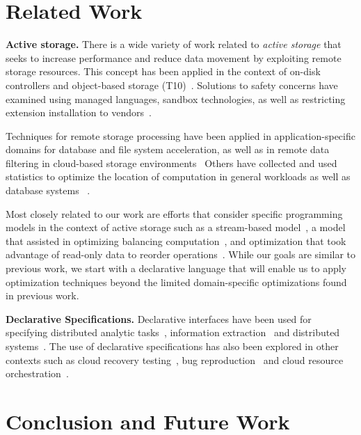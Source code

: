 \documentclass[10pt,twocolumn]{article}
\begin{document}
\section{Related Work}

{\bf Active storage.}
There is a wide variety of work related to \emph{active storage} that seeks to
increase performance and reduce data movement by exploiting remote storage
resources. This concept has been applied in the context of on-disk
controllers and object-based storage
(T10)~\cite{riedel:vldb98,du:nwesp05,xie:msst11}.  Solutions to safety
concerns have examined using managed languages, sandbox technologies, as well
as restricting extension installation to
vendors~\cite{john:hiperio08,xie:msst11,runde:msst12}.

Techniques for remote storage processing have been applied in
application-specific domains for database and file system acceleration, as
well as in remote data filtering in cloud-based storage
environments~\cite{uysal:hpca00,chiu:iccs03,lim:msst08,gkantsidis:nsdi13}
Others have collected and used statistics to optimize the location of
computation in general workloads as well as database systems
~\cite{chen:cluster12,chen:icpp12,qiao:icde08}.

Most closely related to our work are efforts that consider specific
programming models in the context of active storage such as a stream-based
model~\cite{acharya:asplos98}, a model that assisted in optimizing balancing
computation~\cite{wickremesinghe:hpdc022}, and optimization that took
advantage of read-only data to reorder operations~\cite{huston:fast04}.
While our goals are similar to previous work, we start with a declarative
language that will enable us to apply optimization techniques beyond
the limited domain-specific optimizations found in previous work.

{\bf Declarative Specifications.}
Declarative interfaces have been used for specifying distributed analytic 
tasks~\cite{olston_pig_2008,thusoo_hive_2010}, information 
extraction~\cite{shen_declarative_2007} and distributed 
systems~\cite{conway_logic_2012,bauer_legion_2014}. The use of declarative 
specifications has also been explored in other contexts such as cloud recovery 
testing~\cite{gunawi_fate_2011}, bug reproduction~\cite{li_reprolite_2014} and 
cloud resource orchestration~\cite{liu_declarative_2011}.

\section{Conclusion and Future Work}
\end{document}
